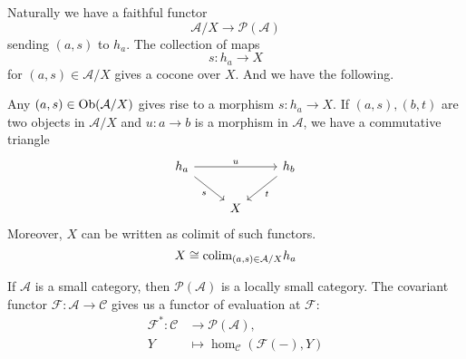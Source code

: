 Naturally we have a faithful functor 
\[\mathcal{A}/X\rightarrow \mathcal{P}(\mathcal{A})\]
sending \((a,s)\) to \(h_a\). The collection of maps 
\[s:h_a\rightarrow X\]
for \((a,s)\in \mathcal{A}/X\) gives a cocone over \(X\). And we have the following.
\begin{proposition}    
     Any \((a,s)\in \text{Ob}(\mathcal{A}/X)\) gives rise to a morphism \(s:h_a\rightarrow X\). If \((a,s),(b,t)\) are two objects in \(\mathcal{A}/X\) and \(u:a\rightarrow b\) is a morphism in \(\mathcal{A}\), we have a commutative triangle 
     \[\begin{tikzcd}
         {h_a} && {h_b} \\
         & X
         \arrow["u", from=1-1, to=1-3]
         \arrow["s"', from=1-1, to=2-2]
         \arrow["t", from=1-3, to=2-2]
       \end{tikzcd}\]
      Moreover, \(X\) can be written as colimit of such functors.
      \[X\cong \text{colim}_{(a,s)\in \mathcal{A}/X}h_a\]
\end{proposition}

If \(\mathcal{A}\) is a small category, then \(\mathcal{P}(\mathcal{A})\) is a locally small category. The covariant functor \(\mathcal{F}:\mathcal{A}\rightarrow \mathcal{C}\) gives us a functor of evaluation at \(\mathcal{F}\):
\begin{align*}
     \mathcal{F}^*:\mathcal{C}&\rightarrow \mathcal{P}(\mathcal{A}),\\ 
                   Y&\mapsto \hom_\mathcal{C}(\mathcal{F}(-),Y)
\end{align*}

